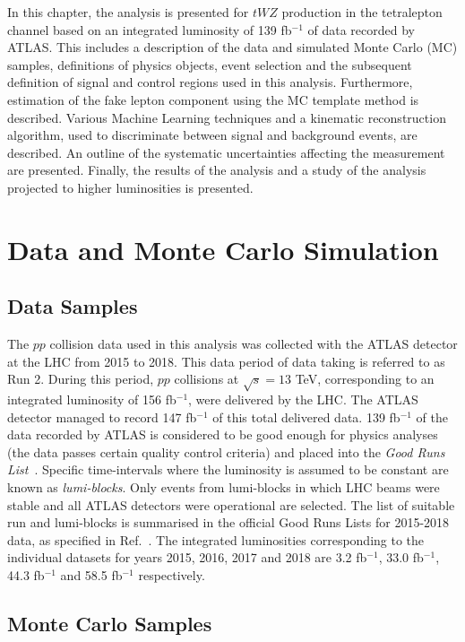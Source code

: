 

In this chapter, the analysis is presented for $tWZ$ production in the tetralepton channel based on an integrated luminosity of 139 fb$^{-1}$ of data recorded by ATLAS. This includes a description of the data and simulated Monte Carlo (MC) samples, definitions of physics objects, event selection and the subsequent definition of signal and control regions used in this analysis. Furthermore, estimation of the fake lepton component using the MC template method is described. Various Machine Learning techniques and a kinematic reconstruction algorithm, used to discriminate between signal and background events, are described. An outline of the systematic uncertainties affecting the measurement are presented. Finally, the results of the analysis and a study of the analysis projected to higher luminosities is presented. 


\section{Data and Monte Carlo Simulation}
\subsection{Data Samples}
The $pp$ collision data used in this analysis was collected with the ATLAS detector at the LHC from 2015 to 2018. This data period of data taking is referred to as Run 2. During this period, $pp$ collisions at $\sqrt{s}=13$ TeV, corresponding to an integrated luminosity of 156 fb$^{-1}$, were delivered by the LHC. The ATLAS detector managed to record 147 fb$^{-1}$ of this total delivered data. 139 fb$^{-1}$ of the data recorded by ATLAS is considered to be good enough for physics analyses (the data passes certain quality control criteria) and placed into the \textit{Good Runs List}~\cite{GoodRunLists}. Specific time-intervals where the luminosity is assumed to be constant are known as \textit{lumi-blocks}. Only events from lumi-blocks in which LHC beams were stable and all ATLAS detectors were operational are selected. The list of suitable run and lumi-blocks is summarised in the official Good Runs Lists for 2015-2018 data, as specified in Ref.~\cite{goodrunslist}. The integrated luminosities corresponding to the individual datasets for years 2015, 2016, 2017 and 2018 are 3.2 fb$^{-1}$, 33.0 fb$^{-1}$, 44.3 fb$^{-1}$ and 58.5 fb$^{-1}$ respectively.


\subsection{Monte Carlo Samples}
\label{sec:mcsamples}

